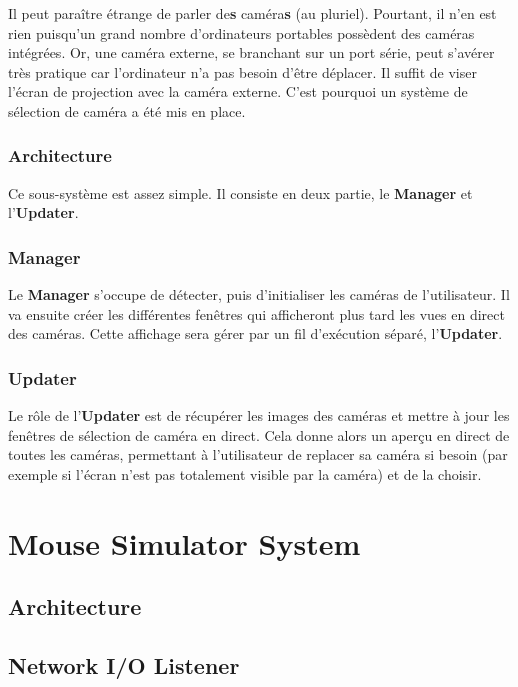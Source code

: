\documentclass[11pt,a4paper,oldfontcommands]{memoir}
\begin{document}
Il peut paraître étrange de parler de\textbf{s} caméra\textbf{s} (au pluriel). Pourtant, il n'en est rien puisqu'un grand nombre d'ordinateurs portables possèdent des caméras intégrées. Or, une caméra externe, se branchant sur un port série, peut s'avérer très pratique car l'ordinateur n'a pas besoin d'être déplacer. Il suffit de viser l'écran de projection avec la caméra externe. C'est pourquoi un système de sélection de caméra a été mis en place.

\subsubsection{Architecture}

Ce sous-système est assez simple. Il consiste en deux partie, le \textbf{Manager} et l'\textbf{Updater}.

\subsubsection{Manager}

Le \textbf{Manager} s'occupe de détecter, puis d'initialiser les caméras de l'utilisateur. Il va ensuite créer les différentes fenêtres qui afficheront plus tard les vues en direct des caméras. Cette affichage sera gérer par un fil d'exécution séparé, l'\textbf{Updater}.

\subsubsection{Updater}

Le rôle de l'\textbf{Updater} est de récupérer les images des caméras et mettre à jour les fenêtres de sélection de caméra en direct. Cela donne alors un aperçu en direct de toutes les caméras, permettant à l'utilisateur de replacer sa caméra si besoin (par exemple si l'écran n'est pas totalement visible par la caméra) et de la choisir.

\newpage

\section{Mouse Simulator System}

\subsection{Architecture}

\subsection{Network I/O Listener}
\end{document}
